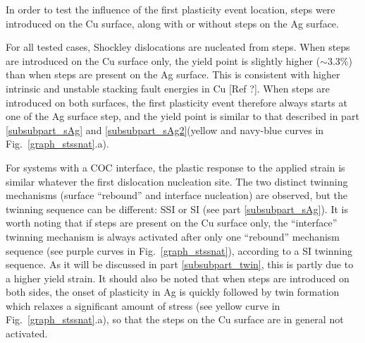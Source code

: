 \documentclass[final,3p,times,twocolumn]{elsarticle}
\begin{document}
In order to test the influence of the first plasticity event location, steps were introduced on the Cu surface, along with or without steps on the Ag surface.
	
For all tested cases, Shockley dislocations are nucleated from   steps. When steps are introduced on the Cu surface only, the yield point is slightly higher ($\sim 3.3\%$) than when steps are present on the Ag surface. This is consistent with higher intrinsic and unstable stacking fault energies in Cu [Ref ?]. When steps are introduced on both surfaces, the first plasticity event therefore always starts at one of the Ag surface step, and the yield point is similar to that described in part \ref{subsubpart_sAg} and \ref{subsubpart_sAg2}(yellow and navy-blue curves in Fig.~\ref{graph_stssnat}.a). 

For systems with a COC interface, the plastic response to the applied strain is similar whatever the first dislocation nucleation site. The two distinct twinning mechanisms (surface ``rebound'' and interface nucleation) are observed, but the twinning sequence can be different: SSI or SI (see part \ref{subsubpart_sAg}). 
It is worth noting that if steps are present on the Cu surface only, the ``interface'' twinning mechanism is always activated after only one ``rebound'' mechanism sequence (see purple curves in Fig.~\ref{graph_stssnat}), according to a SI twinning sequence. As it will be discussed in part \ref{subsubpart_twin}, this is partly due to a higher yield strain. It should also be noted that when steps are introduced on both sides, the onset of plasticity in Ag is quickly followed by twin formation which relaxes a significant amount of stress (see yellow curve in Fig.~\ref{graph_stssnat}.a), so that the steps on the Cu surface are in general not activated.
\end{document}
